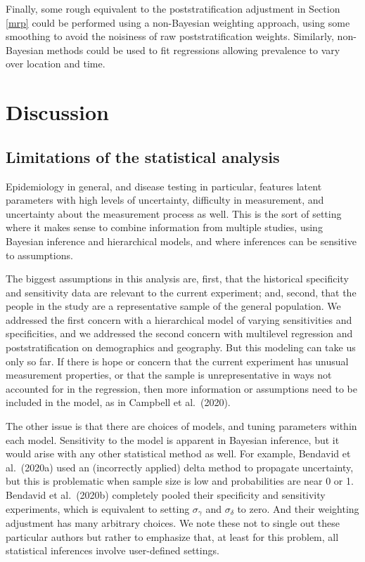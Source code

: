 \documentclass[11pt]{article}
\begin{document}
Finally, some rough equivalent to the poststratification adjustment in Section \ref{mrp} could be performed using a non-Bayesian weighting approach, using some smoothing to avoid the noisiness of raw poststratification weights.  Similarly, non-Bayesian methods could be used to fit regressions allowing prevalence to vary over location and time.

\section{Discussion}


\subsection{Limitations of the statistical analysis}


Epidemiology in general, and disease testing in particular, features latent parameters with high levels of uncertainty, difficulty in measurement, and uncertainty about the measurement process as well.  This is the sort of setting where it makes sense to combine information from multiple studies, using Bayesian inference and hierarchical models, and where inferences can be sensitive to assumptions.

The biggest assumptions in this analysis are, first, that the historical specificity and sensitivity data are relevant to the current experiment; and, second, that the people in the study are a representative sample of the general population.  We addressed the first concern with a hierarchical model of varying sensitivities and specificities, and we addressed the second concern with multilevel regression and poststratification on demographics and geography.  But this modeling can take us only so far.  If there is hope or concern that the current experiment has unusual measurement properties, or that the sample is unrepresentative in ways not accounted for in the regression, then more information or assumptions need to be included in the model, as in Campbell et al.\ (2020).

The other issue is that there are choices of models, and tuning parameters within each model.  Sensitivity to the model is apparent in Bayesian inference, but it would arise with any other statistical method as well.  For example, Bendavid et al.\ (2020a) used an (incorrectly applied) delta method to propagate uncertainty, but this is problematic when sample size is low and probabilities are near 0 or 1.  Bendavid  et al.\ (2020b) completely pooled their specificity and sensitivity experiments, which is equivalent to setting $\sigma_{\gamma}$ and $\sigma_{\delta}$ to zero.  And their weighting adjustment has many arbitrary choices.  We note these not to single out these particular authors but rather to emphasize that, at least for this problem, all statistical inferences involve user-defined settings.
\end{document}
